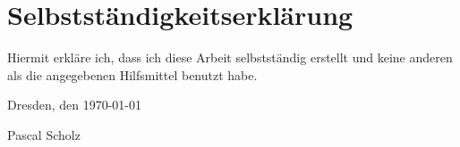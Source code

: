 
\section*{\vfill{} \thispagestyle{empty}
  Selbstständigkeitserklärung}

Hiermit erkläre ich, dass ich diese Arbeit selbstständig erstellt
und keine anderen als die angegebenen Hilfsmittel benutzt habe.
\bigskip{}

\noindent Dresden, den \today %
\vspace{2.5cm}

\noindent Pascal Scholz \cleardoublepage{}
